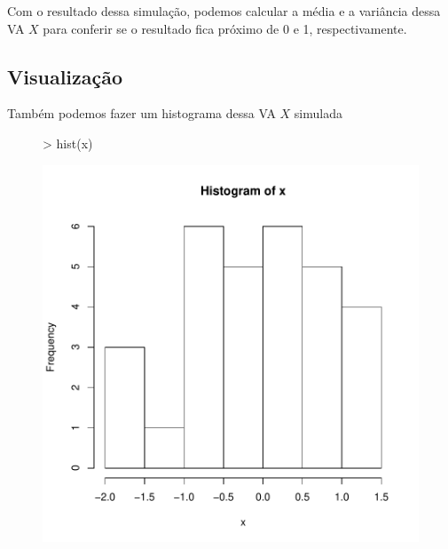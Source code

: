 \documentclass{article}
\begin{document}
Com o resultado dessa simulação, podemos calcular a média e a variância
dessa VA $X$ para conferir se o resultado fica próximo de 0 e 1,
respectivamente.

\subsection{Visualização}

Também podemos fazer um histograma dessa VA $X$ simulada

\begin{figure}
\begin{Schunk}
\begin{Sinput}
> hist(x)
\end{Sinput}
\end{Schunk}
\includegraphics{Exemplo0-Sweave-histm}
\end{figure}
\end{document}
